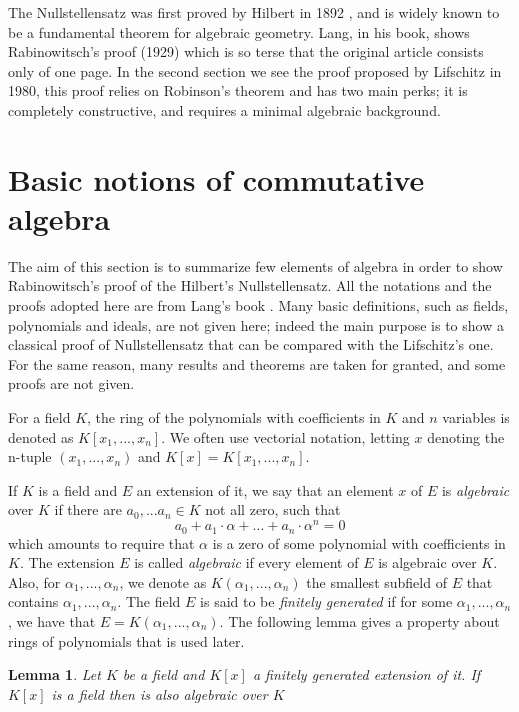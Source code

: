 \documentclass[a4paper,12pt,oneside]{book}
\newtheorem{lemma}[theorem]{Lemma}
\begin{document}
The Nullstellensatz was first proved by Hilbert \cite{Hilbert} in 1892 , and is widely known to be a fundamental theorem for algebraic geometry. Lang, in his book,  shows Rabinowitsch's proof (1929) which is so terse that the original article \cite{Rabin} consists only of one page. 
In the second section we see the proof proposed by Lifschitz \cite{lifschitz} in 1980, this proof relies on Robinson's theorem and has two main perks; it is completely constructive, and requires a minimal algebraic background. 




\section{Basic notions of commutative algebra}
The aim of this section is to summarize few elements of algebra in order to show  Rabinowitsch's proof of the Hilbert's Nullstellensatz. All the notations and the proofs adopted here are from Lang's book \cite{Lang}. Many basic definitions, such as fields, polynomials and ideals, are not given here; indeed the main purpose is to show a classical proof of Nullstellensatz that can be compared with the Lifschitz's one.
For the same reason, many results and theorems are taken for granted, and some proofs are not given.




For a field $K$, the ring of the polynomials with coefficients in $K$ and $n$ variables is denoted as $K[x_1,...,x_n ]$. We often use vectorial notation, letting  $x$ denoting the n-tuple $(x_1,...,x_n)$ and $K[x]= K[x_1,...,x_n ] $.


If $K$ is a field and $E$ an extension of it, we say that an element $x$ of $E$ is \textit{algebraic} over $K$ if there are $a_0, ... a_n\in K$ not all zero, such that
$$ a_0 + a_1 \cdot \alpha + ...+ a_n \cdot \alpha^n=0 $$ 
which amounts to require that $\alpha$  is a zero of some polynomial with coefficients in $K$. The extension $E$ is called \textit{algebraic} if every element of $E$ is algebraic over $K$. 
Also, for $\alpha_1, ...,\alpha_n $, we denote as $K(\alpha_1, ...,\alpha_n) $ the smallest subfield of $E$ that contains $\alpha_1, ...,\alpha_n$. The field $E$ is said to be \textit{finitely generated} if for some $\alpha_1, ...,\alpha_n$, we have that $E=K(\alpha_1, ...,\alpha_n)$. 
The following lemma gives a property about rings of polynomials that is used later.
\begin{lemma}\label{finit_gen}
Let $K$ be a field and $K[x]$ a finitely generated extension of it. If $K[x]$ is a field then is also algebraic over $K$
\end{lemma}
\end{document}
